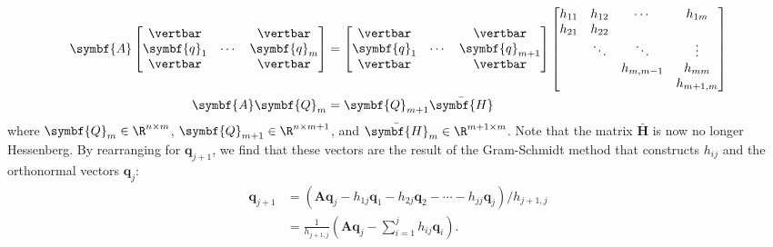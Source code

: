 \documentclass{article}
\begin{document}
\begin{align*}
    \symbf{A}
    \begin{bmatrix}
        \vertbar    &        & \vertbar    \\
        \symbf{q}_1 & \cdots & \symbf{q}_m \\
        \vertbar    &        & \vertbar    \\
    \end{bmatrix}
                          & =
    \begin{bmatrix}
        \vertbar    &        & \vertbar        \\
        \symbf{q}_1 & \cdots & \symbf{q}_{m+1} \\
        \vertbar    &        & \vertbar        \\
    \end{bmatrix}
    \begin{bmatrix}
        h_{11} & h_{12} & \cdots    & h_{1m}    \\
        h_{21} & h_{22} &           &           \\
               & \ddots & \ddots    & \vdots    \\
               &        & h_{m,m-1} & h_{mm}    \\
               &        &           & h_{m+1,m} \\
    \end{bmatrix}
    \\
    \symbf{A} \symbf{Q}_m & = \symbf{Q}_{m+1} \bar{\symbf{H}}
\end{align*}
where \(\symbf{Q}_m \in \R^{n \times m}\), \(\symbf{Q}_{m+1} \in \R^{n \times m+1}\),
and \(\bar{\symbf{H}}_m \in \R^{m+1 \times m}\). Note that the matrix
\(\bar{\symbf{H}}\) is now no longer Hessenberg. By rearranging for
\(\symbf{q}_{j+1}\), we find that these vectors are the result of the
Gram-Schmidt method that constructs \(h_{ij}\) and the orthonormal
vectors \(\symbf{q}_j\):
\begin{align*}
    \symbf{q}_{j+1} & = \left( \symbf{A} \symbf{q}_j - h_{1j} \symbf{q}_1 - h_{2j} \symbf{q}_2 - \cdots - h_{jj} \symbf{q}_j \right) / h_{j+1,j} \\
                    & = \frac{1}{h_{j+1,j}} \left( \symbf{A} \symbf{q}_j - \sum_{i=1}^j h_{ij} \symbf{q}_i \right).
\end{align*}
\end{document}
